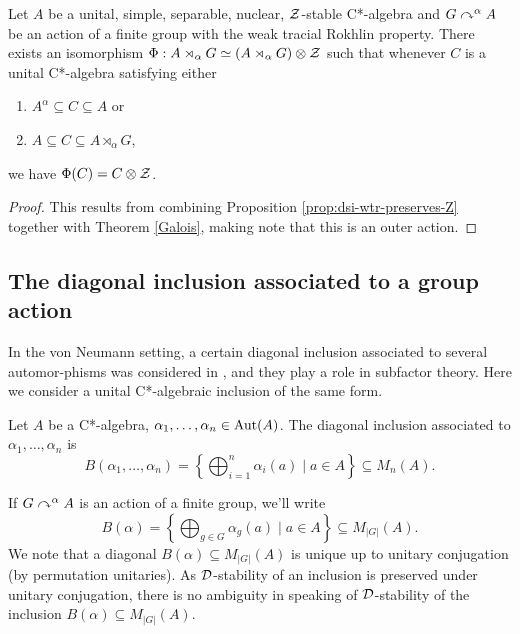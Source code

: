\documentclass[12pt]{amsart}
\begin{document}
        \begin{cor}\label{weaktracialRokhlinintermediate}
            Let $A$ be a unital, simple, separable, nuclear, $\mathcal{Z}$-stable C*-algebra and $G \curvearrowright^\alpha A$ be an action of a finite group with the weak tracial Rokhlin property. There exists an isomorphism $\Phi: A \rtimes_\alpha G \simeq (A \rtimes_\alpha G) \otimes \mathcal{Z}$ such that whenever $C$ is a unital C*-algebra satisfying either
              \begin{enumerate}
                \item $A^\alpha \subseteq C \subseteq A$ or
                \item $A \subseteq C \subseteq A \rtimes_\alpha G$,
              \end{enumerate}
              we have $\Phi(C) = C \otimes \mathcal{Z}$. 
                \begin{proof}
                  This results from combining Proposition \ref{prop:dsi-wtr-preserves-Z} together with Theorem \ref{Galois}, making note that this is an outer action. 
                \end{proof}
          \end{cor}

        \subsection{The diagonal inclusion associated to a group action}\label{ssection:dse-diagonal-inclusions} In the von Neumann setting, a certain diagonal inclusion associated to several automor\hyp{}phisms was considered in \cite{Popa89,Kawamuro99,Burstein10}, and they play a role in subfactor theory. Here we consider a  unital C*-algebraic inclusion of the same form.

    \begin{defn}
      Let $A$ be a C*-algebra, $\alpha_1,\dots,\alpha_n \in \operatorname{Aut}(A)$. The diagonal inclusion associated to $\alpha_1,\dots,\alpha_n$ is
\begin{equation}
      B(\alpha_1,\dots,\alpha_n) = \left\{\bigoplus_{i=1}^n \alpha_i(a) \mid a \in A \right\} \subseteq M_n(A).
\end{equation}
    \end{defn}

    If $G \curvearrowright^\alpha A$ is an action of a finite group, we'll write
    \begin{equation}
        B(\alpha) = \left\{\bigoplus_{g \in G} \alpha_g(a) \mid a \in A\right\} \subseteq M_{|G|}(A).
    \end{equation}
We note that a diagonal $B(\alpha) \subseteq M_{|G|}(A)$ is unique up to unitary conjugation (by permutation unitaries). As $\mathcal{D}$-stability of an inclusion is preserved under unitary conjugation, there is no ambiguity in speaking of $\mathcal{D}$-stability of the inclusion $B(\alpha) \subseteq M_{|G|}(A)$.
    
\end{document}
